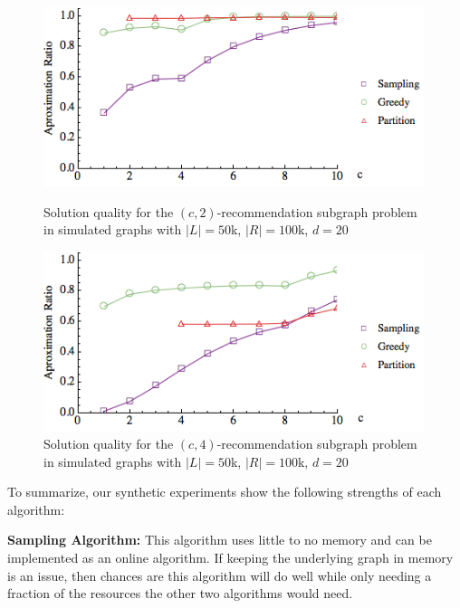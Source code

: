 \begin{figure}[t]
\centering
\begin{minipage}[h]{0.48\textwidth}
\centering
\includegraphics[width=0.99\textwidth]{images/l=50000,r=100000,a=2_Greedy_vs_Naive.png}
\vspace{-1cm}
\caption{Solution quality for the $(c, 2)$-recommendation subgraph problem in simulated graphs with $|L|=50$k, $|R|=100$k, $d=20$}\label{fig:a=2}
\end{minipage}
\vspace{.2cm}
\hspace{0cm}
\begin{minipage}[h]{0.48\textwidth}
\centering
\includegraphics[width=0.99\textwidth]{images/l=50000,r=100000,a=4_Greedy_vs_Naive.png}
\vspace{-1cm}
\caption{Solution quality for the $(c, 4)$-recommendation subgraph problem in simulated graphs with $|L|=50$k, $|R|=100$k, $d=20$}\label{fig:a=4}
\end{minipage}
\end{figure}

\vs
To summarize, our synthetic experiments show the following strengths of each algorithm: \vs

\textbf{Sampling Algorithm:} This algorithm uses little to no memory and can
be implemented as an online algorithm. If keeping the underlying graph in
memory is an issue, then chances are this algorithm will do well while only needing
a fraction of the resources the other two algorithms would need. \vs

